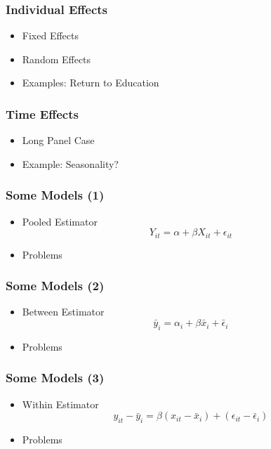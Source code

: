 \documentclass{beamer}
\newcommand{\1}{\mathbb{1}}
\begin{document}
\begin{frame}\frametitle{Individual Effects}
\begin{itemize}
 \item Fixed Effects
 \item Random Effects
 \item Examples: Return to Education
\end{itemize}
\end{frame}

\begin{frame}\frametitle{Time Effects}
\begin{itemize}
 \item Long Panel Case
 \item Example: Seasonality? 
\end{itemize}
\end{frame}

\begin{frame}\frametitle{Some Models (1)}
\begin{itemize}
 \item Pooled Estimator
 \begin{equation}
  Y_{it} = \alpha + \beta X_{it} + \epsilon_{it}
 \end{equation}
\item Problems
\end{itemize}
\end{frame}

\begin{frame}\frametitle{Some Models (2)}
\begin{itemize}
 \item Between Estimator
 \begin{equation}
  \bar{y}_i = \alpha_i + \beta \bar{x}_{i} + \bar{\epsilon}_{i}
 \end{equation}
\item Problems
\end{itemize}
\end{frame}

\begin{frame}\frametitle{Some Models (3)}
\begin{itemize}
 \item Within Estimator
 \begin{equation}
 y_{it} - \bar{y}_i =  \beta (x_{it} - \bar{x}_{i}) + 
 (\epsilon_{it} - \bar{\epsilon}_{i})
 \end{equation}
\item Problems
\end{itemize}
\end{frame}
\end{document}
